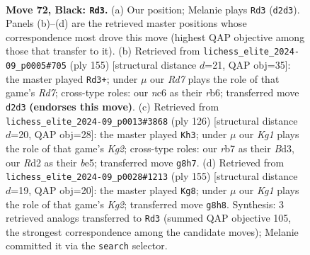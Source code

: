\documentclass[11pt]{article}
\begin{document}
\clearpage

\begin{figure}[p]\centering
\begin{subfigure}{0.46\textwidth}\centering
\resizebox{\linewidth}{!}{%
\newchessgame
\chessboard[
  setfen={6k1/1R4p1/2N2p2/7p/3P3P/6PK/3r4/8 b - - 38 72},
  showmover=false,
  pgfstyle=straightmove, color=movearrow, markmove={d2-d3}
]}
\caption{}
\end{subfigure}\hfill
\begin{subfigure}{0.46\textwidth}\centering
\resizebox{\linewidth}{!}{%
\newchessgame
\chessboard[
  setfen={8/8/1R6/4kpp1/p7/P5KP/1P1r1P2/8 b - - 80 78},
  showmover=false,
  pgfstyle=straightmove, color=movearrow, markmove={d2-d3}
]}
\caption{}
\end{subfigure}
\\[4pt]
\begin{subfigure}{0.46\textwidth}\centering
\resizebox{\linewidth}{!}{%
\newchessgame
\chessboard[
  setfen={8/8/6pk/4b2p/1p5P/3B2P1/P5K1/8 w - - 1 64},
  showmover=false,
  pgfstyle=straightmove, color=movearrow, markmove={g2-h3}
]}
\caption{}
\end{subfigure}\hfill
\begin{subfigure}{0.46\textwidth}\centering
\resizebox{\linewidth}{!}{%
\newchessgame
\chessboard[
  setfen={8/5pk1/3R2p1/7p/5P1P/6PK/r7/8 b - - 32 78},
  showmover=false,
  pgfstyle=straightmove, color=movearrow, markmove={g7-g8}
]}
\caption{}
\end{subfigure}
\caption{\textbf{Move 72, Black: \texttt{Rd3}.} (a) Our position; Melanie plays \texttt{Rd3} (\texttt{d2d3}). Panels (b)--(d) are the retrieved master positions whose correspondence most drove this move (highest QAP objective among those that transfer to it). (b) Retrieved from \texttt{lichess\_elite\_2024-09\_p0005\#705} (ply 155) [structural distance $d$=21, QAP obj=35]: the master played \texttt{Rd3+}; under $\mu$ our \emph{Rd7} plays the role of that game's \emph{Rd7}; cross-type roles: our \emph{n}c6 as their \emph{r}b6; transferred move \texttt{d2d3} \textbf{(endorses this move)}. (c) Retrieved from \texttt{lichess\_elite\_2024-09\_p0013\#3868} (ply 126) [structural distance $d$=20, QAP obj=28]: the master played \texttt{Kh3}; under $\mu$ our \emph{Kg1} plays the role of that game's \emph{Kg2}; cross-type roles: our \emph{r}b7 as their \emph{B}d3, our \emph{R}d2 as their \emph{b}e5; transferred move \texttt{g8h7}. (d) Retrieved from \texttt{lichess\_elite\_2024-09\_p0028\#1213} (ply 155) [structural distance $d$=19, QAP obj=20]: the master played \texttt{Kg8}; under $\mu$ our \emph{Kg1} plays the role of that game's \emph{Kg2}; transferred move \texttt{g8h8}. Synthesis: 3 retrieved analogs transferred to \texttt{Rd3} (summed QAP objective 105, the strongest correspondence among the candidate moves); Melanie committed it via the \texttt{search} selector.}
\label{fig:thought-m143}
\end{figure}
\end{document}
